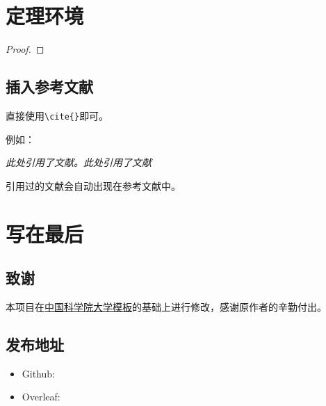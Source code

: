 \documentclass{SYSUReport}
\begin{document}
\section{定理环境}
\begin{Theorem}
\end{Theorem}

\begin{Lemma}
\end{Lemma}

\begin{Corollary}
\end{Corollary}

\begin{Proposition}
\end{Proposition}

\begin{Definition}
\end{Definition}

\begin{Example}
\end{Example}

\begin{proof}
\end{proof}

\subsection{插入参考文献}
直接使用\verb|\cite{}|即可。

例如：


\textit{ 此处引用了文献\cite{0Isaac}。此处引用了文献\cite{2016The}}


引用过的文献会自动出现在参考文献中。

\section{写在最后}

\subsection{致谢}

本项目在\href{https://github.com/jweihe/UCAS_Latex_Template}{中国科学院大学模板}的基础上进行修改，感谢原作者的辛勤付出。

\subsection{发布地址}
\begin{itemize}
    \item Github: \url{}
    \item Overleaf:  \url{}
\end{itemize}


\newpage


\end{document}
